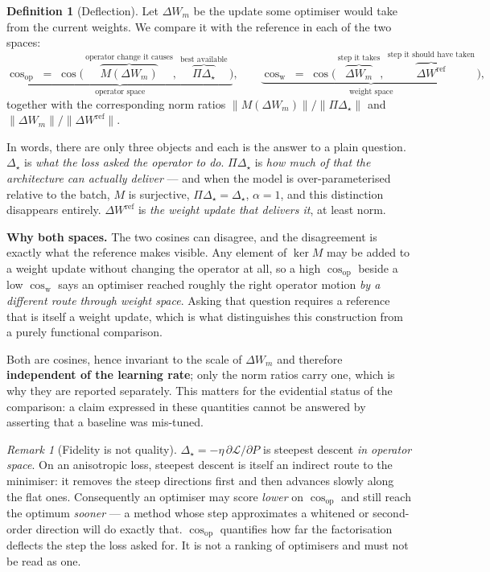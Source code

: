 \documentclass{article} %
\theoremstyle{plain}
\theoremstyle{definition}
\newtheorem{definition}[theorem]{Definition}
\theoremstyle{remark}
\newtheorem{remark}[theorem]{Remark}
\begin{document}
\begin{definition}[Deflection]
Let $\Delta W_m$ be the update some optimiser would take from the current weights. We compare it
with the reference in each of the two spaces:
\begin{equation}
  \underbrace{\cos_{\mathrm{op}} \;=\; \cos\!\big(\,\overbrace{M(\Delta W_m)}^{\text{operator change it causes}},\
      \overbrace{\Pi \Delta_\star}^{\text{best available}}\,\big)}_{\text{operator space}},
  \qquad
  \underbrace{\cos_{\mathrm{w}} \;=\; \cos\!\big(\,\overbrace{\Delta W_m}^{\text{step it takes}},\
      \overbrace{\Delta W^{\mathrm{ref}}}^{\text{step it should have taken}}\,\big)}_{\text{weight space}},
\end{equation}
together with the corresponding norm ratios $\|M(\Delta W_m)\|/\|\Pi\Delta_\star\|$ and
$\|\Delta W_m\|/\|\Delta W^{\mathrm{ref}}\|$.
\end{definition}

In words, there are only three objects and each is the answer to a plain question.
$\Delta_\star$ is \emph{what the loss asked the operator to do}. $\Pi\Delta_\star$ is \emph{how much
of that the architecture can actually deliver} --- and when the model is over-parameterised
relative to the batch, $M$ is surjective, $\Pi\Delta_\star=\Delta_\star$, $\alpha=1$, and this
distinction disappears entirely. $\Delta W^{\mathrm{ref}}$ is \emph{the weight update that delivers
it}, at least norm.

\textbf{Why both spaces.} The two cosines can disagree, and the disagreement is exactly what the
reference makes visible. Any element of $\ker M$ may be added to a weight update without changing
the operator at all, so a high $\cos_{\mathrm{op}}$ beside a low $\cos_{\mathrm{w}}$ says an
optimiser reached roughly the right operator motion \emph{by a different route through weight
space}. Asking that question requires a reference that is itself a weight update, which is what
distinguishes this construction from a purely functional comparison.

Both are cosines, hence invariant to the scale of $\Delta W_m$ and therefore \textbf{independent of
the learning rate}; only the norm ratios carry one, which is why they are reported separately. This
matters for the evidential status of the comparison: a claim expressed in these quantities cannot
be answered by asserting that a baseline was mis-tuned.

\begin{remark}[Fidelity is not quality]
\label{rem:fidelity}
$\Delta_\star = -\eta\,\partial\mathcal{L}/\partial P$ is steepest descent \emph{in operator
space}. On an anisotropic loss, steepest descent is itself an indirect route to the minimiser: it
removes the steep directions first and then advances slowly along the flat ones. Consequently an
optimiser may score \emph{lower} on $\cos_{\mathrm{op}}$ and still reach the optimum \emph{sooner}
--- a method whose step approximates a whitened or second-order direction will do exactly that.
$\cos_{\mathrm{op}}$ quantifies how far the factorisation deflects the step the loss asked for. It
is not a ranking of optimisers and must not be read as one.
\end{remark}
\end{document}
